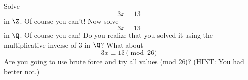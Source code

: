   Solve
  \[
    3x = 13
  \]
  in $\Z$. Of course you can't! Now solve
  \[
    3x = 13
  \]
  in $\Q$. Of course you can!
  Do you realize that you solved it using the multiplicative inverse of $3$ in $\Q$?
  What about
  \[
    3x \equiv 13 \pmod{26}
  \]
  Are you going to use brute force and try all values (mod 26)?
  (HINT: You had better not.)
